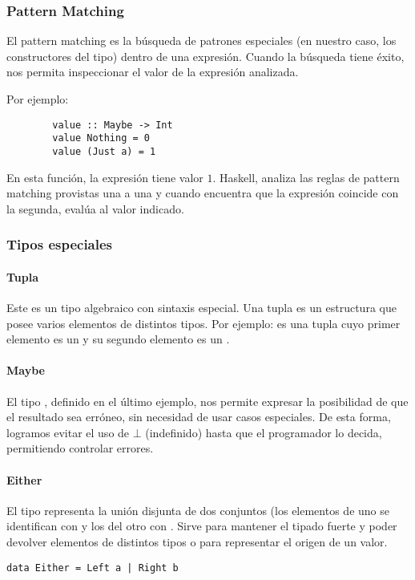 \subsubsection{Pattern Matching}
El pattern matching es la búsqueda de patrones especiales (en nuestro caso, los constructores del tipo) dentro de una expresión. Cuando la búsqueda tiene éxito, nos permita inspeccionar el valor de la expresión analizada.

Por ejemplo:

\begin{centrado}
	\begin{verbatim}
		value :: Maybe -> Int 
		value Nothing = 0
		value (Just a) = 1
	\end{verbatim}
\end{centrado}

En esta función, la expresión  tiene valor $1$. Haskell, analiza las reglas de pattern matching provistas una a una y cuando encuentra que la expresión coincide con la segunda, evalúa al valor indicado.



\subsubsection{Tipos especiales}
\paragraph{Tupla} Este es un tipo algebraico con sintaxis especial. Una tupla es un estructura que posee varios elementos de distintos tipos. Por ejemplo:  es una tupla cuyo primer elemento es un  y su segundo elemento es un .

\paragraph{Maybe} El tipo , definido en el último ejemplo, nos permite expresar la posibilidad de que el resultado sea erróneo, sin necesidad de usar casos especiales. De esta forma, logramos evitar el uso de $\bot$ (indefinido) hasta que el programador lo decida, permitiendo controlar errores.

\paragraph{Either} El tipo  representa la unión disjunta de dos conjuntos (los elementos de uno se identifican con  y los del otro con . Sirve para mantener el tipado fuerte y poder devolver elementos de distintos tipos o para representar el origen de un valor.
\begin{centrado}
	\begin{verbatim}
data Either = Left a | Right b
	\end{verbatim}
\end{centrado}

